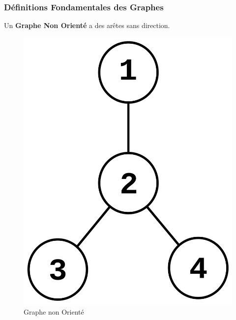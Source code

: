 \begin{frame}
\frametitle{Définitions Fondamentales des Graphes}

\begin{tcolorbox}[colback=orange!10,colframe=orange!100!black,
    title=Graphe Non Orienté]
Un \textbf{Graphe Non Orienté} a des arêtes sans direction.
\end{tcolorbox}

\begin{figure}[H]
    \centering
    \includegraphics[width=0.3 \textwidth]{Figures/grapheNonOriente.png}
    \caption{Graphe non Orienté}
    \label{fig:Graphe non Orienté}
\end{figure}

\end{frame}
